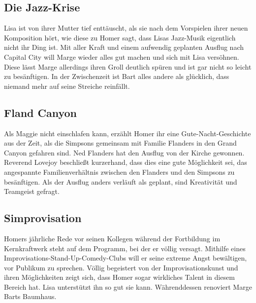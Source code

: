 \subsection{Die Jazz-Krise}\label{VABF11}
Lisa ist von ihrer Mutter tief enttäuscht, als sie nach dem Vorspielen ihrer neuen Komposition hört, wie diese zu Homer sagt, dass Lisas Jazz-Musik eigentlich nicht ihr Ding ist. Mit aller Kraft und einem aufwendig geplanten Ausflug nach Capital City will Marge wieder alles gut machen und sich mit Lisa versöhnen. Diese lässt Marge allerdings ihren Groll deutlich spüren und ist gar nicht so leicht zu besänftigen. In der Zwischenzeit ist Bart alles andere als glücklich, dass niemand mehr auf seine Streiche reinfällt.



\subsection{Fland Canyon}
Als Maggie nicht einschlafen kann, erzählt Homer ihr eine Gute-Nacht-Geschichte aus der Zeit, als die Simpsons gemeinsam mit Familie Flanders in den Grand Canyon gefahren sind. Ned Flanders hat den Ausflug von der Kirche gewonnen. Reverend Lovejoy beschließt kurzerhand, dass dies eine gute Möglichkeit sei, das angespannte Familienverhältnis zwischen den Flanders und den Simpsons zu besänftigen. Als der Ausflug anders verläuft als geplant, sind Kreativität und Teamgeist gefragt.


\subsection{Simprovisation}
Homers jährliche Rede vor seinen Kollegen während der Fortbildung im Kernkraftwerk steht auf dem Programm, bei der er völlig versagt. Mithilfe eines Improvisations-Stand-Up-Comedy-Clubs will er seine extreme Angst bewältigen, vor Publikum zu sprechen. Völlig begeistert von der Improvisationskunst und ihren Möglichkeiten zeigt sich, dass Homer sogar wirkliches Talent in diesem Bereich hat. Lisa unterstützt ihn so gut sie kann. Währenddessen renoviert Marge Barts Baumhaus.

